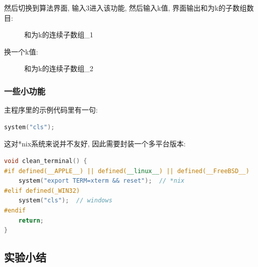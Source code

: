 \documentclass[supercite]{Experimental_Report}
\theoremstyle{definition}
\begin{document}
\clearpage
\noindent
然后切换到算法界面, 输入3进入该功能, 然后输入k值, 界面输出和为k的子数组数目:
\begin{figure}[htbp]
	\centering
	\centering
	\caption{和为k的连续子数组\_1}
	\label{fig4-7}
\end{figure}

\noindent
换一个k值:
\begin{figure}[htbp]
	\centering
	\centering
	\caption{和为k的连续子数组\_2}
	\label{fig4-8}
\end{figure}

\newpage
\subsubsection{一些小功能}
\noindent
主程序里的示例代码里有一句:
\begin{lstlisting}[language=C++, frame=single]
system("cls");
\end{lstlisting}
这对*nix系统来说并不友好, 因此需要封装一个多平台版本:
\begin{lstlisting}[language=C++, frame=single]
void clean_terminal() {
#if defined(__APPLE__) || defined(__linux__) || defined(__FreeBSD__)
	system("export TERM=xterm && reset");  // *nix
#elif defined(_WIN32)
	system("cls");  // windows
#endif
	return;
}
\end{lstlisting}

\newpage

\subsection{实验小结}
\end{document}
